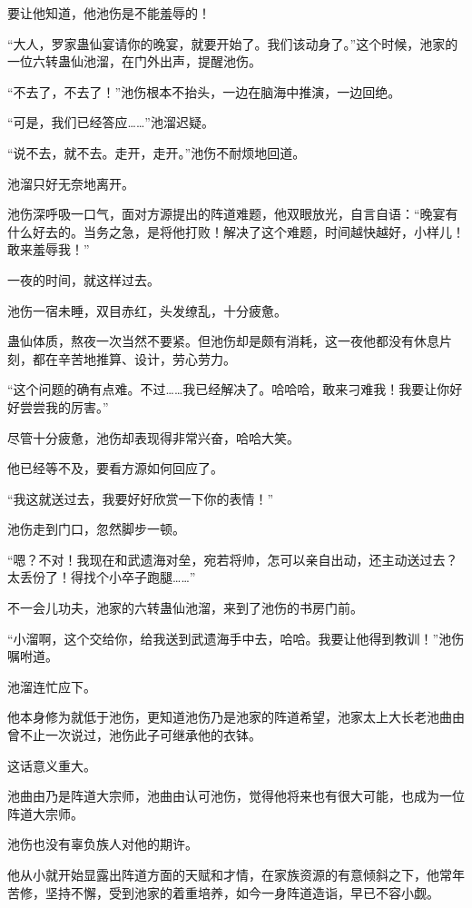 \begin{this_body}
要让他知道，他池伤是不能羞辱的！

“大人，罗家蛊仙宴请你的晚宴，就要开始了。我们该动身了。”这个时候，池家的一位六转蛊仙池溜，在门外出声，提醒池伤。

“不去了，不去了！”池伤根本不抬头，一边在脑海中推演，一边回绝。

“可是，我们已经答应……”池溜迟疑。

“说不去，就不去。走开，走开。”池伤不耐烦地回道。

池溜只好无奈地离开。

池伤深呼吸一口气，面对方源提出的阵道难题，他双眼放光，自言自语：“晚宴有什么好去的。当务之急，是将他打败！解决了这个难题，时间越快越好，小样儿！敢来羞辱我！”

一夜的时间，就这样过去。

池伤一宿未睡，双目赤红，头发缭乱，十分疲惫。

蛊仙体质，熬夜一次当然不要紧。但池伤却是颇有消耗，这一夜他都没有休息片刻，都在辛苦地推算、设计，劳心劳力。

“这个问题的确有点难。不过……我已经解决了。哈哈哈，敢来刁难我！我要让你好好尝尝我的厉害。”

尽管十分疲惫，池伤却表现得非常兴奋，哈哈大笑。

他已经等不及，要看方源如何回应了。

“我这就送过去，我要好好欣赏一下你的表情！”

池伤走到门口，忽然脚步一顿。

“嗯？不对！我现在和武遗海对垒，宛若将帅，怎可以亲自出动，还主动送过去？太丢份了！得找个小卒子跑腿……”

不一会儿功夫，池家的六转蛊仙池溜，来到了池伤的书房门前。

“小溜啊，这个交给你，给我送到武遗海手中去，哈哈。我要让他得到教训！”池伤嘱咐道。

池溜连忙应下。

他本身修为就低于池伤，更知道池伤乃是池家的阵道希望，池家太上大长老池曲由曾不止一次说过，池伤此子可继承他的衣钵。

这话意义重大。

池曲由乃是阵道大宗师，池曲由认可池伤，觉得他将来也有很大可能，也成为一位阵道大宗师。

池伤也没有辜负族人对他的期许。

他从小就开始显露出阵道方面的天赋和才情，在家族资源的有意倾斜之下，他常年苦修，坚持不懈，受到池家的着重培养，如今一身阵道造诣，早已不容小觑。


\end{this_body}
